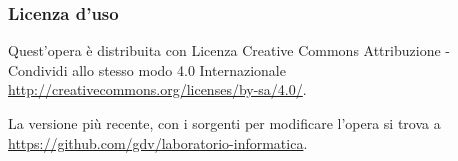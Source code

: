 \documentclass[12pt]{beamer}
\begin{document}
\begin{frame}[containsverbatim]\frametitle{Licenza d'uso}
  \small
Quest'opera è distribuita con Licenza Creative Commons
Attribuzione - Condividi allo stesso modo 4.0 Internazionale
\url{http://creativecommons.org/licenses/by-sa/4.0/}.

La versione più recente, con i sorgenti per modificare l'opera si trova
a \url{https://github.com/gdv/laboratorio-informatica}.

\end{frame}
\end{document}

